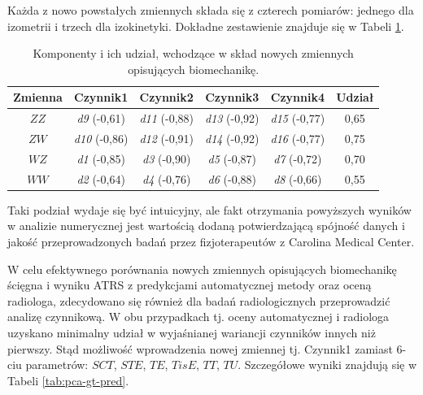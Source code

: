 Każda z nowo powstałych zmiennych składa się z czterech pomiarów: jednego dla izometrii i trzech dla izokinetyki. Dokładne zestawienie znajduje się w Tabeli \ref{tab:bio-new-factors}.

\begin{table}[h]
	\centering
	\setlength{\tabcolsep}{3pt}
	\setlength\extrarowheight{2pt}
	\caption{Komponenty i ich udział, wchodzące w skład nowych zmiennych opisujących biomechanikę.}
	\label{tab:bio-new-factors}
	\begin{tabular}{c|c|c|c|c||c}
		Zmienna&Czynnik1&Czynnik2&Czynnik3&Czynnik4&Udział \\
		\hline \hline
		$ZZ$&\textit{d9} (-0,61)&\textit{d11} (-0,88)&\textit{d13} (-0,92)&\textit{d15} (-0,77)&0,65\\
		\hline
		$ZW$&\textit{d10} (-0,86)&\textit{d12} (-0,91)&\textit{d14} (-0,92)&\textit{d16} (-0,77)&0,75\\
		\hline
		$WZ$&\textit{d1} (-0,85)&\textit{d3} (-0,90)&\textit{d5} (-0,87)&\textit{d7} (-0,72)&0,70\\
		\hline
		$WW$&\textit{d2} (-0,64)&\textit{d4} (-0,76)&\textit{d6} (-0,88)&\textit{d8} (-0,66)&0,55\\
		
			
	\end{tabular}
\end{table}

Taki podział wydaje się być intuicyjny, ale fakt otrzymania powyższych wyników w analizie numerycznej jest wartością dodaną potwierdzającą spójność danych i jakość przeprowadzonych badań przez fizjoterapeutów z Carolina Medical Center. 

W celu efektywnego porównania nowych zmiennych opisujących biomechanikę ścięgna i wyniku ATRS z predykcjami automatycznej metody oraz oceną radiologa, zdecydowano się również dla badań radiologicznych przeprowadzić analizę czynnikową. W obu przypadkach tj. oceny automatycznej i radiologa uzyskano minimalny udział w wyjaśnianej wariancji czynników innych niż pierwszy. Stąd możliwość wprowadzenia nowej zmiennej tj. Czynnik1 zamiast 6-ciu parametrów: $SCT$, $STE$, $TE$, $TisE$, $TT$, $TU$. Szczegółowe wyniki znajdują się w Tabeli \ref{tab:pca-gt-pred}.

